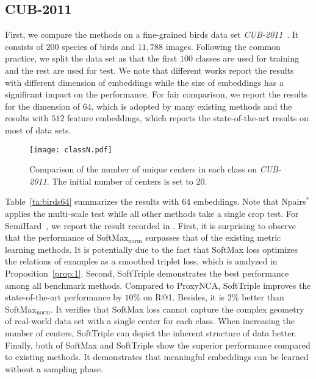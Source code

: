 \documentclass[10pt,twocolumn,letterpaper]{article}
\begin{document}
\subsection{CUB-2011}
First, we compare the methods on a fine-grained birds data set \textit{CUB-2011}~\cite{WahCUB_200_2011}. It consists of $200$ species of birds and $11,788$ images. Following the common practice, we split the data set as that the first $100$ classes are used for training and the rest are used for test. We note that different works report the results with different dimension of embeddings while the size of embeddings has a significant impact on the performance. For fair comparison, we report the results for the dimension of $64$, which is adopted by many existing methods and the results with $512$ feature embeddings, which reports the state-of-the-art results on most of data sets. 

\begin{figure*}[!ht]
\centering
\texttt{[image: classN.pdf]}
\caption{Comparison of the number of unique centers in each class on \textit{CUB-2011}. The initial number of centers is set to $20$.\label{fig:classn}}
\end{figure*}

Table~\ref{ta:birds64} summarizes the results with $64$ embeddings. Note that Npairs$^*$ applies the multi-scale test while all other methods take a single crop test. For SemiHard~\cite{SchroffKP15}, we report the result recorded in \cite{SongJR017}. First, it is surprising to observe that the performance of SoftMax$_\mathrm{norm}$ surpasses that of the existing metric learning methods. It is potentially due to the fact that SoftMax loss optimizes the relations of examples as a smoothed triplet loss, which is analyzed in Proposition~\ref{prop:1}. Second, SoftTriple demonstrates the best performance among all benchmark methods. Compared to ProxyNCA, SoftTriple improves the state-of-the-art performance by $10\%$ on R@1. Besides, it is $2\%$ better than SoftMax$_{\mathrm{norm}}$. It verifies that SoftMax loss cannot capture the complex geometry of real-world data set with a single center for each class. When increasing the number of centers, SoftTriple can depict the inherent structure of data better. Finally, both of SoftMax and SoftTriple show the superior performance compared to existing methods. It demonstrates that meaningful embeddings can be learned without a sampling phase.
\end{document}
